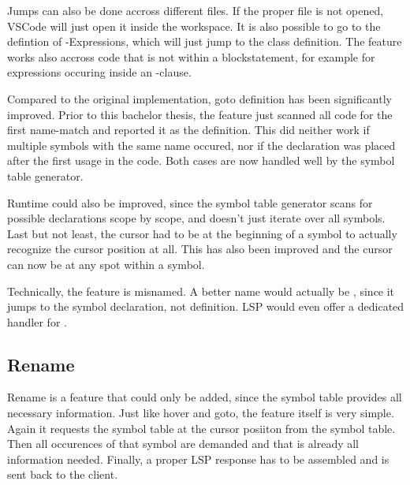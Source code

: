 
Jumps can also be done accross different files.
If the proper file is not opened, VSCode will just open it inside the workspace.
It is also possible to go to the defintion of -Expressions, which will just jump to the class definition.
The feature works also accross code that is not within a blockstatement, for example for expressions occuring inside an -clause.

Compared to the original implementation, goto definition has been significantly improved.
Prior to this bachelor thesis, the feature just scanned all code for the first name-match and reported it as the definition.
This did neither work if multiple symbols with the same name occured, nor if the declaration was placed after the first usage in the code.
Both cases are now handled well by the symbol table generator.

Runtime could also be improved, since the symbol table generator scans for possible declarations scope by scope, and doesn't just iterate over all symbols.
Last but not least, the cursor had to be at the beginning of a symbol to actually recognize the cursor position at all.
This has also been improved and the cursor can now be at any spot within a symbol.

Technically, the feature is misnamed.
A better name would actually be , since it jumps to the symbol declaration, not definition.
LSP would even offer a dedicated handler for  \cite{lspspec}.

\subsection{Rename}
Rename is a feature that could only be added, since the symbol table provides all necessary information.
Just like hover and goto, the feature itself is very simple.
Again it requests the symbol table at the cursor posiiton from the symbol table.
Then all occurences of that symbol are demanded and that is already all information needed.
Finally, a proper LSP response has to be assembled and is sent back to the client.

